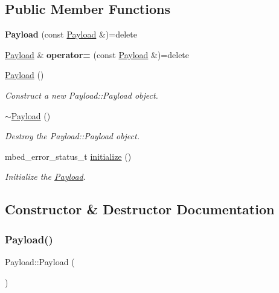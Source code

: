 \subsection*{Public Member Functions}
\begin{DoxyCompactItemize}
\item 
\mbox{\label{class_payload_a5751d22141f7d3340f71140b5885d898}} 
{\bfseries Payload} (const \mbox{\hyperlink{class_payload}{Payload}} \&)=delete
\item 
\mbox{\label{class_payload_a19146ac25baf7d79c3370db8abb114c3}} 
\mbox{\hyperlink{class_payload}{Payload}} \& {\bfseries operator=} (const \mbox{\hyperlink{class_payload}{Payload}} \&)=delete
\item 
\mbox{\hyperlink{class_payload_a2273069256ace43b81a84778a7da6039}{Payload}} ()
\begin{DoxyCompactList}\small\item\em Construct a new Payload\+::\+Payload object. \end{DoxyCompactList}\item 
\mbox{\hyperlink{class_payload_ae391ae4ea0e160ee9dd58c559bbf74f7}{$\sim$\+Payload}} ()
\begin{DoxyCompactList}\small\item\em Destroy the Payload\+::\+Payload object. \end{DoxyCompactList}\item 
mbed\+\_\+error\+\_\+status\+\_\+t \mbox{\hyperlink{class_payload_aa55a2da734e6950391d73b0837bbd3b9}{initialize}} ()
\begin{DoxyCompactList}\small\item\em Initialize the \mbox{\hyperlink{class_payload}{Payload}}. \end{DoxyCompactList}\end{DoxyCompactItemize}


\subsection{Constructor \& Destructor Documentation}
\mbox{\label{class_payload_a2273069256ace43b81a84778a7da6039}} 
\subsubsection{\texorpdfstring{Payload()}{Payload()}}
{\footnotesize\ttfamily Payload\+::\+Payload (\begin{DoxyParamCaption}{ }\end{DoxyParamCaption})}




